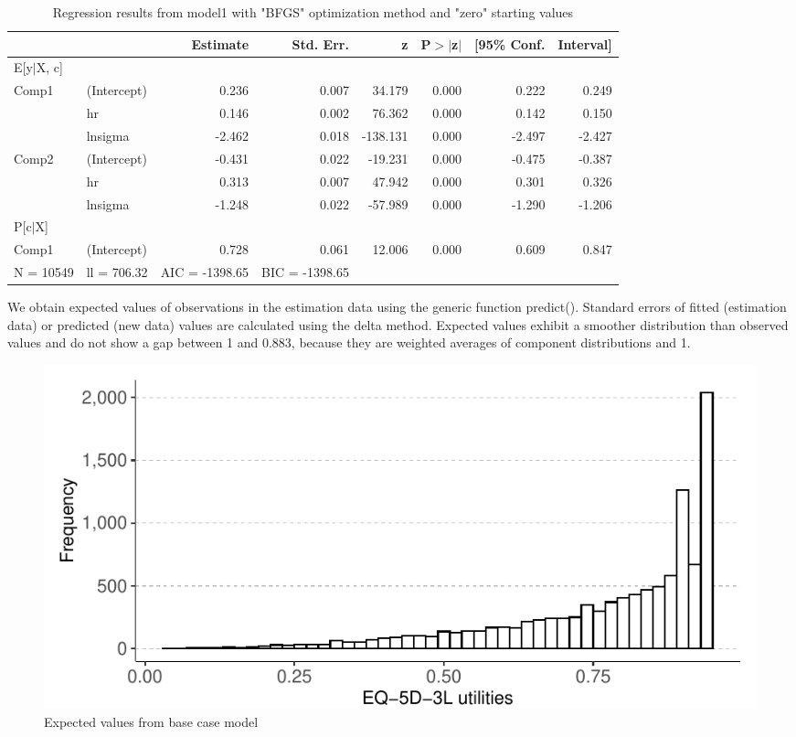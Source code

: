 \documentclass[
]{article}
\begin{document}
\begin{table}[ht]
\centering
\caption{Regression results from model1 with "BFGS" optimization method and "zero" starting values} 
\label{tab:tab-sum-mod1bfgs}
\begin{tabular}{llrrrrrr}
  \hline
 &  & Estimate & Std. Err. & z & P$>$$|$z$|$ & [95\% Conf.  & Interval] \\ 
  \hline
E[y$|$X, c] &  &  &  &  &  &  &  \\ 
   \hline
Comp1 & (Intercept) & 0.236 & 0.007 & 34.179 & 0.000 & 0.222 & 0.249 \\ 
   & hr & 0.146 & 0.002 & 76.362 & 0.000 & 0.142 & 0.150 \\ 
   & lnsigma & -2.462 & 0.018 & -138.131 & 0.000 & -2.497 & -2.427 \\ 
  Comp2 & (Intercept) & -0.431 & 0.022 & -19.231 & 0.000 & -0.475 & -0.387 \\ 
   & hr &  0.313 & 0.007 &  47.942 & 0.000 &  0.301 &  0.326 \\ 
   & lnsigma & -1.248 & 0.022 & -57.989 & 0.000 & -1.290 & -1.206 \\ 
   \hline
P[c$|$X] &  &  &  &  &  &  &  \\ 
   \hline
Comp1 & (Intercept) & 0.728 & 0.061 & 12.006 & 0.000 & 0.609 & 0.847 \\ 
   \hline
N = 10549 & ll = 706.32 & AIC = -1398.65 & BIC = -1398.65 &  &  &  &  \\ 
  \end{tabular}
\end{table}

We obtain expected values of observations in the estimation data using the generic function predict(). Standard errors of fitted (estimation data) or predicted (new data) values are calculated using the delta method. Expected values exhibit a smoother distribution than observed values and do not show a gap between 1 and 0.883, because they are weighted averages of component distributions and 1.

\begin{figure}
\centering
\includegraphics{aldvmm_vignette_files/figure-latex/plot-hist-pred-1.pdf}
\caption{\label{fig:plot-hist-pred}Expected values from base case model}
\end{figure}
\end{document}

